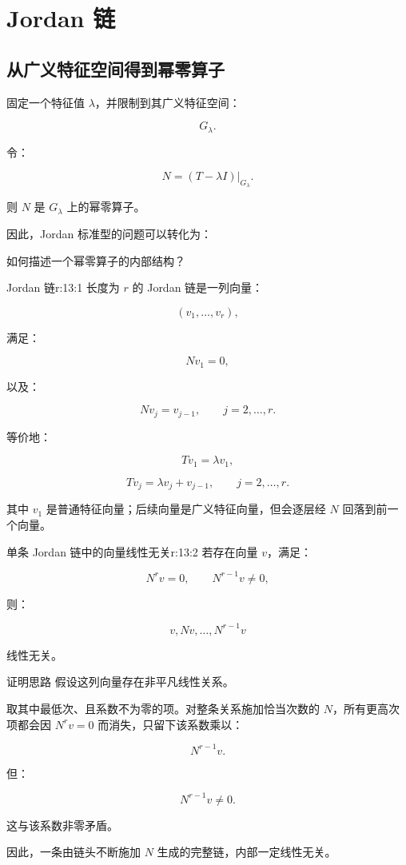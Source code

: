 
\chapter{Jordan 链}


\section{从广义特征空间得到幂零算子}

固定一个特征值 $\lambda$，并限制到其广义特征空间：

\[
G_\lambda.
\]

令：

\[
N=(T-\lambda I)|_{G_\lambda}.
\]

则 $N$ 是 $G_\lambda$ 上的幂零算子。

因此，Jordan 标准型的问题可以转化为：

\begin{jinsight}
如何描述一个幂零算子的内部结构？
\end{jinsight}

\begin{jdefn}{Jordan 链}{r:13:1}
长度为 $r$ 的 Jordan 链是一列向量：

\[
(v_1,\ldots,v_r),
\]

满足：

\[
Nv_1=0,
\]

以及：

\[
Nv_j=v_{j-1},
\qquad
j=2,\ldots,r.
\]

等价地：

\[
Tv_1=\lambda v_1,
\]

\[
Tv_j=\lambda v_j+v_{j-1},
\qquad
j=2,\ldots,r.
\]

其中 $v_1$ 是普通特征向量；后续向量是广义特征向量，但会逐层经 $N$ 回落到前一个向量。
\end{jdefn}

\begin{jprop}{单条 Jordan 链中的向量线性无关}{r:13:2}
若存在向量 $v$，满足：

\[
N^{r}v=0,
\qquad
N^{r-1}v\ne0,
\]

则：

\[
v,Nv,\ldots,N^{r-1}v
\]

线性无关。
\end{jprop}

\begin{jproof}{证明思路}
假设这列向量存在非平凡线性关系。

取其中最低次、且系数不为零的项。对整条关系施加恰当次数的 $N$，所有更高次项都会因 $N^rv=0$ 而消失，只留下该系数乘以：

\[
N^{r-1}v.
\]

但：

\[
N^{r-1}v\ne0.
\]

这与该系数非零矛盾。

因此，一条由链头不断施加 $N$ 生成的完整链，内部一定线性无关。
\end{jproof}

